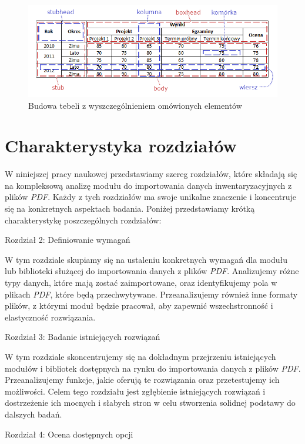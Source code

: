 \documentclass[a4paper,twoside,12pt]{book}
\begin{document}
\begin{figure}
\includegraphics[width=1\textwidth]{./images/table.png}
\caption{Budowa tebeli z wyszczególnieniem omówionych elementów}
\label{fig:pdf_logo}
\end{figure}

\section{Charakterystyka rozdziałów}

W niniejszej pracy naukowej przedstawiamy szereg rozdziałów, które składają się na kompleksową analizę modułu do importowania danych inwentaryzacyjnych z plików \emph{PDF}. Każdy z tych rozdziałów ma swoje unikalne znaczenie i koncentruje się na konkretnych aspektach badania. Poniżej przedstawiamy krótką charakterystykę poszczególnych rozdziałów:

Rozdział 2: Definiowanie wymagań

W tym rozdziale skupiamy się na ustaleniu konkretnych wymagań dla modułu lub biblioteki służącej do importowania danych z plików \emph{PDF}.
Analizujemy różne typy danych, które mają zostać zaimportowane, oraz identyfikujemy pola w plikach \emph{PDF}, które będą przechwytywane.
Przeanalizujemy również inne formaty plików, z którymi moduł będzie pracował, aby zapewnić wszechstronność i elastyczność rozwiązania.

Rozdział 3: Badanie istniejących rozwiązań

W tym rozdziale skoncentrujemy się na dokładnym przejrzeniu istniejących modułów i bibliotek dostępnych na rynku do importowania danych z plików \emph{PDF}.
Przeanalizujemy funkcje, jakie oferują te rozwiązania oraz przetestujemy ich możliwości. Celem tego rozdziału jest zgłębienie istniejących rozwiązań i dostrzeżenie ich mocnych i słabych stron w celu stworzenia solidnej podstawy do dalszych badań.

Rozdział 4: Ocena dostępnych opcji
\end{document}

